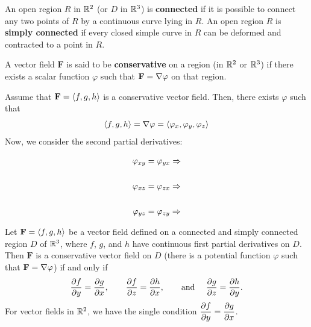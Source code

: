 \documentclass[../mathNotesPreamble]{subfiles}
\begin{document}
  \begin{defn*}
    An open region $R$ in $\mathbb{R}^2$ (or $D$ in $\mathbb{R}^3$) is \textbf{connected} if it is possible to connect any two points of $R$ by a continuous curve lying in $R$. An open region $R$ is \textbf{simply connected} if every closed simple curve in $R$ can be deformed and contracted to a point in $R$.
  \end{defn*}
  \pagebreak

  \begin{defn*}
    A vector field $\mathbf F$ is said to be \textbf{conservative} on a region (in $\mathbb{R}^2$ or $\mathbb{R}^3$) if there exists a scalar function $\varphi$ such that $\mathbf F=\nabla\varphi$ on that region.
  \end{defn*}
  Assume that $\mathbf F={\left\langle f,g,h \right\rangle}$ is a conservative vector field. Then, there exists $\varphi$ such that
    \[{\left\langle f,g,h \right\rangle}=\nabla \varphi={\left\langle \varphi_x, \varphi_y, \varphi_z \right\rangle}\]
  Now, we consider the second partial derivatives:

  \noindent
  \begin{minipage}{0.25\linewidth}
    \begin{align*}
      \varphi_{xy}&= \varphi_{yx} \Rightarrow\\[\baselineskip]
      \varphi_{xz}&= \varphi_{zx} \Rightarrow\\[\baselineskip]
      \varphi_{yz}&= \varphi_{zy} \Rightarrow
    \end{align*}
  \end{minipage}

  \begin{thmBox*}
    Let $\mathbf F={\left\langle f,g,h \right\rangle}$ be a vector field defined on a connected and simply connected region $D$ of $\mathbb{R}^3$, where $f$, $g$, and $h$ have continuous first partial derivatives on $D$. Then $\mathbf F$ is a conservative vector field on $D$ (there is a potential function $\varphi$ such that $\mathbf F=\nabla \varphi$) if and only if
      \[\frac{\partial f}{\partial y}=\frac{\partial g}{\partial x},\qquad
      \frac{\partial f}{\partial z}=\frac{\partial h}{\partial x},\qquad
      \textnormal{and } \quad\frac{\partial g}{\partial z}=\frac{\partial h}{\partial y}.\]
    For vector fields in $\mathbb{R}^2$, we have the single condition $\displaystyle\frac{\partial f}{\partial y}=\frac{\partial g}{\partial x}$.
  \end{thmBox*}
  \pagebreak
\end{document}
